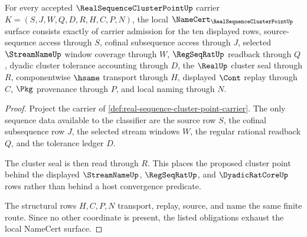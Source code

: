 \begin{theorem}\label{thm:real-sequence-cluster-point-namecert-obligations}
For every accepted $\RealSequenceClusterPointUp$ carrier $K=(S,J,W,Q,D,R,H,C,P,N)$, the local $\NameCert_{\RealSequenceClusterPointUp}$ surface consists exactly of carrier admission for the ten displayed rows, source-sequence access through $S$, cofinal subsequence access through $J$, selected $\StreamNameUp$ window coverage through $W$, $\RegSeqRatUp$ readback through $Q$, dyadic cluster tolerance accounting through $D$, the $\RealUp$ cluster seal through $R$, componentwise $\hsame$ transport through $H$, displayed $\Cont$ replay through $C$, $\Pkg$ provenance through $P$, and local naming through $N$.
\end{theorem}
\begin{proof}
Project the carrier of \autoref{def:real-sequence-cluster-point-carrier}. The only sequence data available to the classifier are the source row $S$, the cofinal subsequence row $J$, the selected stream windows $W$, the regular rational readback $Q$, and the tolerance ledger $D$.

The cluster seal is then read through $R$. This places the proposed cluster point behind the displayed $\StreamNameUp$, $\RegSeqRatUp$, and $\DyadicRatCoreUp$ rows rather than behind a host convergence predicate.

The structural rows $H,C,P,N$ transport, replay, source, and name the same finite route. Since no other coordinate is present, the listed obligations exhaust the local NameCert surface.
\end{proof}

